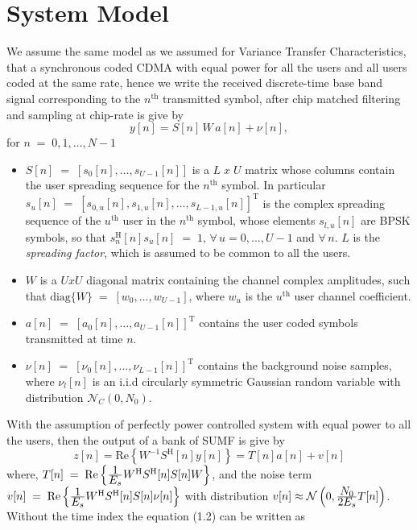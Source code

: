 \section{System Model}
We assume the same model as we assumed for Variance Transfer Characteristics, that a synchronous coded CDMA with equal power for all the users and all users coded at the same rate, hence we write the received discrete-time base band signal corresponding to the $n^{\mathrm{th}}$ transmitted symbol, after chip matched filtering and sampling at chip-rate is give by
\begin{equation}
y[n]=S[n]\,W\,a[n]+\nu[n],
\end{equation}
for $n\;=\;0,1,\dots,N-1$
\begin{itemize}
\item $S[n]\;=\;[s_0[n],\dots,s_{U-1}[n]]$ is a $L\;x\;U$ matrix whose columns contain the user spreading sequence for the $n^{\mathrm{th}}$ symbol. In particular $s_u[n]\;=\;[s_{0,u}[n],s_{1,u}[n],\dots,s_{L-1,u}[n]]^\mathrm{T}$ is the complex spreading sequence of the $u^{\mathrm{th}}$ user in the $n^{\mathrm{th}}$ symbol, whose elements $s_{l,u}[n]$ are BPSK symbols, so that $s_n^{\mathrm{H}}[n]s_u[n]\;=\;1,\,\forall\,u=0,\dots,U-1$ and $\forall\,n$. $L$ is the \textit{spreading factor}, which is assumed to be common to all the users.
\item $W$ is a $UxU$ diagonal matrix containing the channel complex amplitudes, such that $\mathrm{diag}\{W\}\;=\;[w_0,\dots,w_{U-1}]$, where $w_u$ is the $u^{\mathrm{th}}$ user channel coefficient.
\item $a[n]\;=\;[a_0[n],\dots,a_{U-1}[n]]^{\mathrm{T}}$ contains the user coded symbols transmitted at time $n$.
\item $\nu[n]\;=\;[\nu_0[n],\dots,\nu_{L-1}[n]]^{\mathrm{T}}$ contains the background noise samples, where $\nu_l[n]$ is an i.i.d circularly symmetric Gaussian random variable with distribution $\mathcal{N}_C(0,N_0)$.
\end{itemize}
With the assumption of perfectly power controlled system with equal power to all the users, then the output of a bank of SUMF is give by
\begin{equation}
z[n]=\mathrm{Re}\left\{W^{-1}S^{\mathrm{H}}[n]y[n]\right\}=T[n]a[n]+v[n]
\end{equation}
where, $T[n]\;=\;\mathrm{Re}\left\{\frac{\hbox{$1$}}{\hbox{$E_s$}}W^{\mathrm{H}}S^{\mathrm{H}}[n]S[n]W\right\}$, and the noise term $v[n]\;=\;\mathrm{Re}\left\{\frac{\hbox{$1$}}{\hbox{$E_s$}}W^{\mathrm{H}}S^{\mathrm{H}}[n]S[n]\nu[n]\right\}$ with distribution $v[n]\approx \mathcal{N}\left(0,\frac{\hbox{$N_0$}}{\hbox{$2E_s$}}T[n]\right)$. Without the time index the equation (1.2) can be written as 

